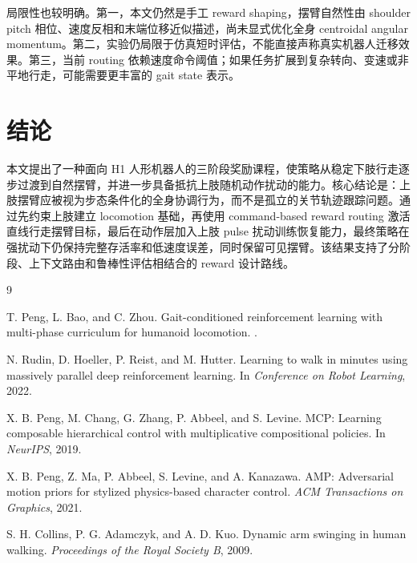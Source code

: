 \documentclass{article}
\begin{document}
局限性也较明确。第一，本文仍然是手工 reward shaping，摆臂自然性由 shoulder pitch 相位、速度反相和末端位移近似描述，尚未显式优化全身 centroidal angular momentum。第二，实验仍局限于仿真短时评估，不能直接声称真实机器人迁移效果。第三，当前 routing 依赖速度命令阈值；如果任务扩展到复杂转向、变速或非平地行走，可能需要更丰富的 gait state 表示。

\section{结论}

本文提出了一种面向 H1 人形机器人的三阶段奖励课程，使策略从稳定下肢行走逐步过渡到自然摆臂，并进一步具备抵抗上肢随机动作扰动的能力。核心结论是：上肢摆臂应被视为步态条件化的全身协调行为，而不是孤立的关节轨迹跟踪问题。通过先约束上肢建立 locomotion 基础，再使用 command-based reward routing 激活直线行走摆臂目标，最后在动作层加入上肢 pulse 扰动训练恢复能力，最终策略在强扰动下仍保持完整存活率和低速度误差，同时保留可见摆臂。该结果支持了分阶段、上下文路由和鲁棒性评估相结合的 reward 设计路线。

\begin{thebibliography}{9}
\small

T. Peng, L. Bao, and C. Zhou.
\newblock Gait-conditioned reinforcement learning with multi-phase curriculum for humanoid locomotion.
.

N. Rudin, D. Hoeller, P. Reist, and M. Hutter.
\newblock Learning to walk in minutes using massively parallel deep reinforcement learning.
\newblock In \emph{Conference on Robot Learning}, 2022.

X. B. Peng, M. Chang, G. Zhang, P. Abbeel, and S. Levine.
\newblock MCP: Learning composable hierarchical control with multiplicative compositional policies.
\newblock In \emph{NeurIPS}, 2019.

X. B. Peng, Z. Ma, P. Abbeel, S. Levine, and A. Kanazawa.
\newblock AMP: Adversarial motion priors for stylized physics-based character control.
\newblock \emph{ACM Transactions on Graphics}, 2021.

S. H. Collins, P. G. Adamczyk, and A. D. Kuo.
\newblock Dynamic arm swinging in human walking.
\newblock \emph{Proceedings of the Royal Society B}, 2009.

\end{thebibliography}
\end{document}
